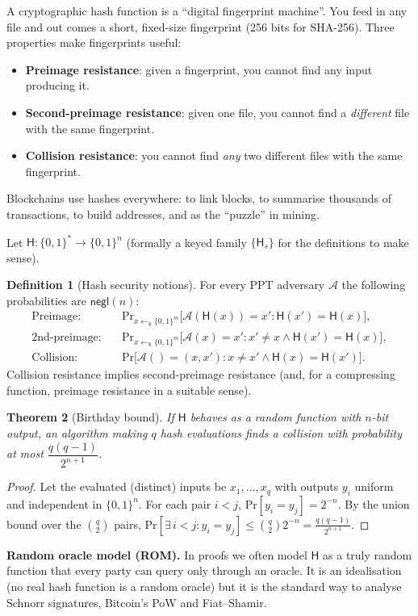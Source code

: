 \documentclass[11pt,a4paper]{article}
\newenvironment{plainenglish}{\par\smallskip}{\par\smallskip}
\newenvironment{formal}{\par\smallskip}{\par\smallskip}
\theoremstyle{definition}
\newtheorem{definition}{Definition}[section]
\theoremstyle{plain}
\newtheorem{theorem}[definition]{Theorem}
\theoremstyle{remark}
\newcommand{\Hash}{\mathsf{H}}
\newcommand{\negl}{\mathsf{negl}}
\renewcommand{\Pr}{\mathrm{Pr}}
\newcommand{\Adv}{\mathcal{A}}
\begin{document}
\begin{plainenglish}
A cryptographic hash function is a ``digital fingerprint machine''. You feed in any file and out comes
a short, fixed-size fingerprint (256 bits for SHA-256). Three properties make fingerprints useful:
\begin{itemize}[nosep]
\item \textbf{Preimage resistance}: given a fingerprint, you cannot find any input producing it.
\item \textbf{Second-preimage resistance}: given one file, you cannot find a \emph{different} file with the same fingerprint.
\item \textbf{Collision resistance}: you cannot find \emph{any} two different files with the same fingerprint.
\end{itemize}
Blockchains use hashes everywhere: to link blocks, to summarise thousands of transactions, to build
addresses, and as the ``puzzle'' in mining.
\end{plainenglish}

\begin{formal}
Let $\Hash:\{0,1\}^*\to\{0,1\}^n$ (formally a keyed family $\{\Hash_s\}$ for the definitions to make sense).

\begin{definition}[Hash security notions]\label{def:hash}
For every PPT adversary $\Adv$ the following probabilities are $\negl(n)$:
\begin{align*}
\text{Preimage:}\quad & \Pr_{x\leftarrow_\$\{0,1\}^m}\big[\Adv(\Hash(x))=x' : \Hash(x')=\Hash(x)\big],\\
\text{2nd-preimage:}\quad & \Pr_{x\leftarrow_\$\{0,1\}^m}\big[\Adv(x)=x' : x'\neq x\wedge \Hash(x')=\Hash(x)\big],\\
\text{Collision:}\quad & \Pr\big[\Adv()=(x,x') : x\neq x'\wedge \Hash(x)=\Hash(x')\big].
\end{align*}
Collision resistance implies second-preimage resistance (and, for a compressing function, preimage resistance in a suitable sense).
\end{definition}

\begin{theorem}[Birthday bound]\label{thm:birthday}
If $\Hash$ behaves as a random function with $n$-bit output, an algorithm making $q$ hash evaluations
finds a collision with probability at most $\dfrac{q(q-1)}{2^{n+1}}$.
\end{theorem}
\begin{proof}
Let the evaluated (distinct) inputs be $x_1,\dots,x_q$ with outputs $y_i$ uniform and independent in
$\{0,1\}^n$. For each pair $i<j$, $\Pr[y_i=y_j]=2^{-n}$. By the union bound over the $\binom q2$ pairs,
$\Pr[\exists\, i<j: y_i=y_j]\le \binom q2 2^{-n}=\frac{q(q-1)}{2^{n+1}}$.
\end{proof}

\textbf{Random oracle model (ROM).} In proofs we often model $\Hash$ as a truly random function that every party can query
only through an oracle. It is an idealisation (no real hash function is a random oracle) but it is
the standard way to analyse Schnorr signatures, Bitcoin's PoW and Fiat--Shamir.
\end{formal}
\end{document}

